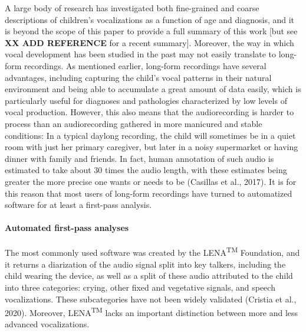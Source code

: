 \documentclass[english,,man]{apa6}
\begin{document}
A large body of research has investigated both fine-grained and coarse descriptions of children's vocalizations as a function of age and diagnosis, and it is beyond the scope of this paper to provide a full summary of this work {[}but see \textbf{XX ADD REFERENCE} for a recent summary{]}. Moreover, the way in which vocal development has been studied in the past may not easily translate to long-form recordings. As mentioned earlier, long-form recordings have several advantages, including capturing the child's vocal patterns in their natural environment and being able to accumulate a great amount of data easily, which is particularly useful for diagnoses and pathologies characterized by low levels of vocal production. However, this also means that the audiorecording is harder to process than an audiorecording gathered in more manicured and stable conditions: In a typical daylong recording, the child will sometimes be in a quiet room with just her primary caregiver, but later in a noisy supermarket or having dinner with family and friends. In fact, human annotation of such audio is estimated to take about 30 times the audio length, with these estimates being greater the more precise one wants or needs to be (Casillas et al., 2017). It is for this reason that most users of long-form recordings have turned to automatized software for at least a first-pass analysis.

\hypertarget{automated-first-pass-analyses}{%
\paragraph{Automated first-pass analyses}\label{automated-first-pass-analyses}}

The most commonly used software was created by the LENA\textsuperscript{TM} Foundation, and it returns a diarization of the audio signal split into key talkers, including the child wearing the device, as well as a split of these audio attributed to the child into three categories: crying, other fixed and vegetative signals, and speech vocalizations. These subcategories have not been widely validated (Cristia et al., 2020). Moreover, LENA\textsuperscript{TM} lacks an important distinction between more and less advanced vocalizations.
\end{document}
